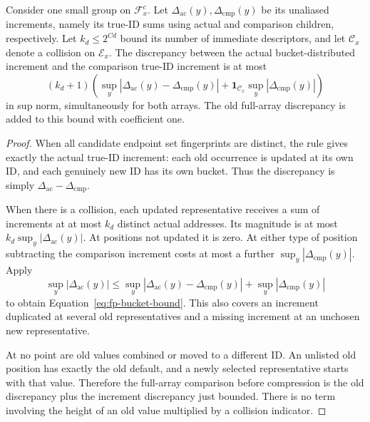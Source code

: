 \begin{lemma}\label{lem:fp-buckets}
Consider one small group on $\mathcal F_x^c$.  Let
$\Delta_{\mathrm{ac}}(y),\Delta_{\mathrm{cmp}}(y)$ be its unaliased
increments, namely its true-ID sums using actual and comparison children,
respectively.  Let $k_d\le2^{C d}$ bound its number of immediate
descriptors, and let $\mathcal C_x$ denote a collision on $\mathcal E_x$.
The discrepancy between the actual bucket-distributed increment and
the comparison true-ID increment is at most
\begin{equation}
 (k_d+1)\left(
       \sup_y|\Delta_{\mathrm{ac}}(y)-\Delta_{\mathrm{cmp}}(y)|
       +\mathbf1_{\mathcal C_x}\sup_y|\Delta_{\mathrm{cmp}}(y)|
                  \right)
 \label{eq:fp-bucket-bound}
\end{equation}
in sup norm, simultaneously for both arrays.  The old full-array
discrepancy is added to this bound with coefficient one.
\end{lemma}

\begin{proof}
When all candidate endpoint set fingerprints are distinct, the rule gives exactly the actual
true-ID increment: each old occurrence is updated at its own ID, and
each genuinely new ID has its own bucket.  Thus the discrepancy is
simply $\Delta_{\mathrm{ac}}-\Delta_{\mathrm{cmp}}$.

When there is a collision, each updated representative receives a sum
of increments at at most $k_d$ distinct actual addresses.  Its magnitude
is at most $k_d\sup_y|\Delta_{\mathrm{ac}}(y)|$.  At positions not
updated it is zero.  At either type of position subtracting the comparison
increment costs at most a further
$\sup_y|\Delta_{\mathrm{cmp}}(y)|$.  Apply
\[
 \sup_y|\Delta_{\mathrm{ac}}(y)|
 \le\sup_y|\Delta_{\mathrm{ac}}(y)-\Delta_{\mathrm{cmp}}(y)|
      +\sup_y|\Delta_{\mathrm{cmp}}(y)|
\]
to obtain Equation~\eqref{eq:fp-bucket-bound}.  This also covers an
increment duplicated at several old representatives and a missing
increment at an unchosen new representative.

At no point are old values combined or moved to a different ID.  An
unlisted old position has exactly the old default, and a newly selected
representative starts with that value.  Therefore the full-array
comparison before compression is the old discrepancy plus the increment
discrepancy just bounded.  There is no term involving the height of an
old value multiplied by a collision indicator.
\end{proof}

